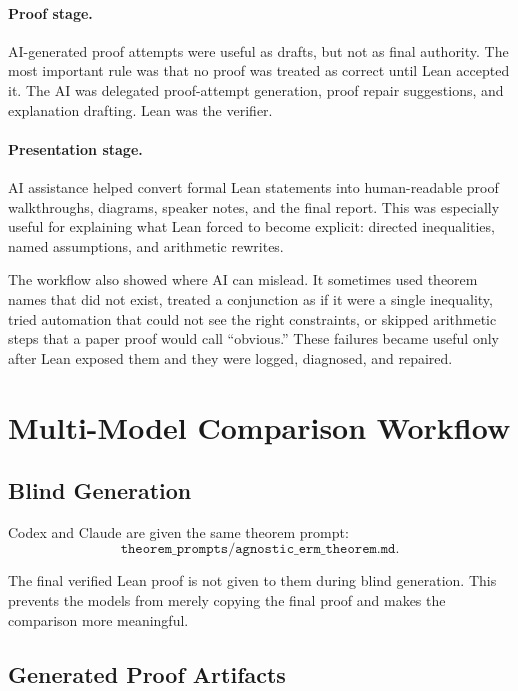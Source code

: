 \documentclass[11pt]{article}
\theoremstyle{definition}
\begin{document}
\paragraph{Proof stage.}
AI-generated proof attempts were useful as drafts, but not as final authority.
The most important rule was that no proof was treated as correct until Lean
accepted it. The AI was delegated proof-attempt generation, proof repair
suggestions, and explanation drafting. Lean was the verifier.

\paragraph{Presentation stage.}
AI assistance helped convert formal Lean statements into human-readable proof
walkthroughs, diagrams, speaker notes, and the final report. This was especially
useful for explaining what Lean forced to become explicit: directed inequalities,
named assumptions, and arithmetic rewrites.

The workflow also showed where AI can mislead. It sometimes used theorem names
that did not exist, treated a conjunction as if it were a single inequality,
tried automation that could not see the right constraints, or skipped arithmetic
steps that a paper proof would call ``obvious.'' These failures became useful
only after Lean exposed them and they were logged, diagnosed, and repaired.

\section{Multi-Model Comparison Workflow}

\subsection{Blind Generation}

Codex and Claude are given the same theorem prompt:
\[
  \texttt{theorem\_prompts/agnostic\_erm\_theorem.md}.
\]

The final verified Lean proof is not given to them during blind generation. This
prevents the models from merely copying the final proof and makes the comparison
more meaningful.

\subsection{Generated Proof Artifacts}
\end{document}
